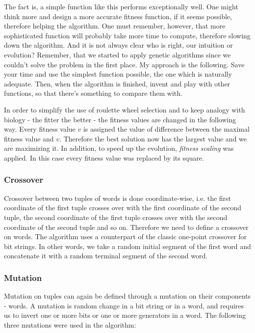 \documentclass{article}
\begin{document}
The fact is, a simple function like this performs exceptionally
well. One might think more and design a more accurate fitness
function, if it seems possible, therefore helping the algorithm. One
must remember, however, that more sophisticated function will probably
take more time to compute, therefore slowing down the algorithm. And
it is not always clear who is right, our intuition or evolution?
Remember, that we started to apply genetic algorithms since we
couldn't solve the problem in the first place. My approach is the
following. Save your time and use the simplest function possible, the
one which is naturally adequate. Then, when the algorithm is finished,
invent and play with other functions, so that there's something to
compare them with.

In order to simplify the use of roulette wheel selection and to keep
analogy with biology - the fitter the better - the fitness values are
changed in the following way. Every fitness value $v$ is assigned the
value of difference between the maximal fitness value and
$v$. Therefore the best solution now has the largest value and we are
maximizing it. In addition, to speed up the evolution, {\em fitness
scaling} was applied. In this case every fitness value was replaced by
its square.

    \subsubsection{Crossover}

Crossover between two tuples of words is done coordinate-wise,
i.e. the first coordinate of the first tuple crosses over with the
first coordinate of the second tuple, the second coordinate of the
first tuple crosses over with the second coordinate of the second
tuple and so on. Therefore we need to define a crossover on words. The
algorithm uses a counterpart of the classic one-point crossover for
bit strings. In other words, we take a random initial segment of the
first word and concatenate it with a random terminal segment of the
second word.

    \subsubsection{Mutation}

Mutation on tuples can again be defined through a mutation on their
components - words. A mutation is random change in a bit string or in
a word, and requires us to invert one or more bits or one or more
generators in a word. The following three mutations were used in the
algorithm:
\end{document}
